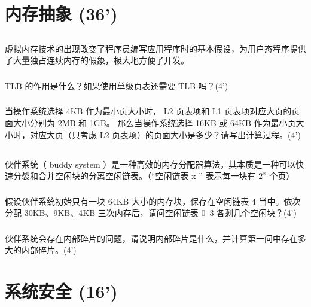 \documentclass[a4paper,12pt]{article}
\newcommand{\score}[1]{(#1')}
\begin{document}
\section{内存抽象 \score{36}}

\subsection{}

虚拟内存技术的出现改变了程序员编写应用程序时的基本假设，为用户态程序提供了大量独占连续内存的假象，极大地方便了开发。

\subsubsection{}

TLB 的作用是什么？如果使用单级页表还需要 TLB 吗？\score{4}

\subsubsection{}

当操作系统选择 4KB 作为最小页大小时， L2 页表项和 L1 页表项对应大页的页面大小分别为 2MB 和 1GB。
那么当操作系统选择 16KB 或 64KB 作为最小页大小时，对应大页（只考虑 L2 页表项）的页面大小是多少？请写出计算过程。\score{4}


\subsection{}

伙伴系统（ buddy system ）是一种高效的内存分配器算法，其本质是一种可以快速分裂和合并空闲块的分离空闲链表。（“空闲链表 x ” 表示每一块有 $2^{x}$ 个页）

\subsubsection{}

假设伙伴系统初始只有一块 64KB 大小的内存块，保存在空闲链表 4 当中。依次分配 30KB、9KB、4KB 三次内存后，请问空闲链表 0~3 各剩几个空闲块？\score{4}

\subsubsection{}

伙伴系统会存在内部碎片的问题，请说明内部碎片是什么，并计算第一问中存在多大的内部碎片。\score{4}

\section{系统安全 \score{16}}
\end{document}
